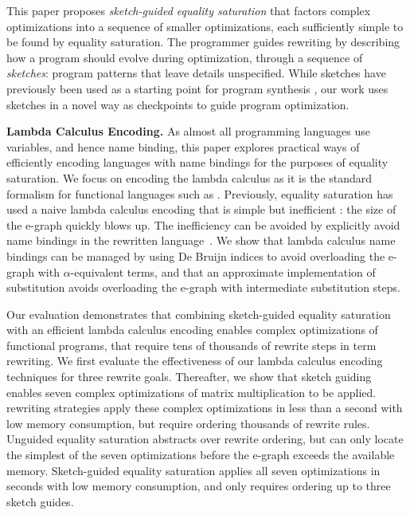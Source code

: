 This paper proposes \emph{sketch-guided equality saturation} that factors complex optimizations into a sequence of smaller optimizations, each sufficiently simple to be found by equality saturation.
The programmer guides rewriting by describing how a program
should evolve during optimization, through a sequence of \emph{sketches}: program patterns that leave details unspecified.
While sketches have previously been used as a starting point for program synthesis \cite{solar2008-synthesis-sketching},
our work uses sketches in a novel way as checkpoints to guide program optimization.

\textbf{Lambda Calculus Encoding.}
As almost all programming languages use variables, and hence name binding, this paper explores practical ways of efficiently encoding languages with name bindings for the purposes of equality saturation.
We focus on encoding the lambda calculus as it is the standard formalism for functional languages such as \Rise{}. Previously, equality saturation has used a naive lambda calculus encoding that is simple but inefficient \cite{willsey2021-egg}: the size of the e-graph quickly blows up.
The inefficiency can be avoided by explicitly avoid name bindings in the rewritten language~\cite{smith2021-access-patterns}. 
We show that lambda calculus name bindings can be managed by using De Bruijn indices to avoid overloading the e-graph with $\alpha$-equivalent terms, and that an approximate implementation of substitution avoids overloading the e-graph with intermediate substitution steps.

\smallskip

Our evaluation demonstrates that combining sketch-guided equality saturation with an efficient lambda calculus encoding enables complex optimizations of \Rise{} functional programs, that require tens of thousands of rewrite steps in term rewriting.
We first evaluate the effectiveness of our lambda calculus encoding techniques for three rewrite goals. Thereafter, we show that sketch guiding enables seven complex optimizations of matrix multiplication to be applied.
\Elevate{} rewriting strategies apply these complex  optimizations in less than a second with low memory consumption, but require ordering thousands of rewrite rules.
Unguided equality saturation abstracts over rewrite ordering, but can only locate the simplest of the seven optimizations before the e-graph exceeds the available memory.
Sketch-guided equality saturation applies all seven optimizations in seconds with low memory consumption, and only requires ordering up to three sketch guides.

